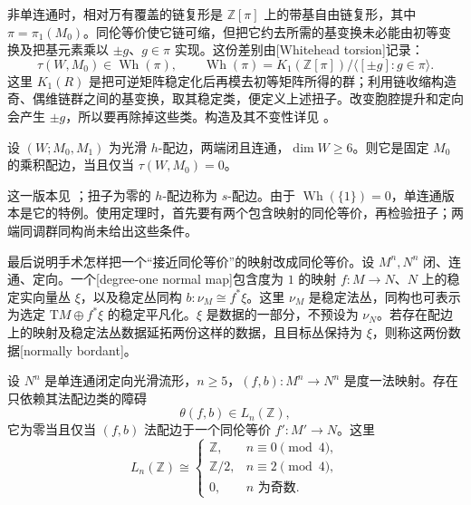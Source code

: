 \ProseParagraphBreak

非单连通时，相对万有覆盖的链复形是 \(\mathbb Z[\pi]\) 上的带基自由链复形，其中 \(\pi=\pi_1(M_0)\)。同伦等价使它链可缩，但把它约去所需的基变换未必能由初等变换及把基元素乘以 \(\pm g\)、\(g\in\pi\) 实现。这份差别由[Whitehead torsion]记录：
\[
	\tau(W,M_0)\in\operatorname{Wh}(\pi),\qquad
	\operatorname{Wh}(\pi)=K_1(\mathbb Z[\pi])/\langle[\pm g]:g\in\pi\rangle.
\]
这里 \(K_1(R)\) 是把可逆矩阵稳定化后再模去初等矩阵所得的群；利用链收缩构造奇、偶维链群之间的基变换，取其稳定类，便定义上述扭子。改变胞腔提升和定向会产生 \(\pm g\)，所以要再除掉这些类。构造及其不变性详见 \cite[第8.1--8.2节]{Ranicki2002Surgery}。

\begin{theorem}[\(s\)-配边定理]\label{g2:thm:s-cobordism}
	设 \((W;M_0,M_1)\) 为光滑 \(h\)-配边，两端闭且连通，\(\dim W\ge6\)。则它是固定 \(M_0\) 的乘积配边，当且仅当 \(\tau(W,M_0)=0\)。
\end{theorem}

这一版本见 \cite[第8.2节]{Ranicki2002Surgery}；扭子为零的 \(h\)-配边称为 \(s\)-配边。由于 \(\operatorname{Wh}(\{1\})=0\)，单连通版本是它的特例。使用定理时，首先要有两个包含映射的同伦等价，再检验扭子；两端同调群同构尚未给出这些条件。

\ProseParagraphBreak

最后说明手术怎样把一个“接近同伦等价”的映射改成同伦等价。设 \(M^n,N^n\) 闭、连通、定向。一个[degree-one normal map]包含度为 \(1\) 的映射 \(f:M\to N\)、\(N\) 上的稳定实向量丛 \(\xi\)，以及稳定丛同构 \(b:\nu_M\cong f^*\xi\)。这里 \(\nu_M\) 是稳定法丛，同构也可表示为选定 \(\mathrm{T}M\oplus f^*\xi\) 的稳定平凡化。\(\xi\) 是数据的一部分，不预设为 \(\nu_N\)。若存在配边上的映射及稳定法丛数据延拓两份这样的数据，且目标丛保持为 \(\xi\)，则称这两份数据[normally bordant]。

\begin{theorem}[手术障碍定理]\label{g2:thm:simply-connected-surgery-obstruction}
	设 \(N^n\) 是单连通闭定向光滑流形，\(n\ge5\)，\((f,b):M^n\to N^n\) 是度一法映射。存在只依赖其法配边类的障碍
	\[
		\theta(f,b)\in L_n(\mathbb Z),
	\]
	它为零当且仅当 \((f,b)\) 法配边于一个同伦等价 \(f':M'\to N\)。这里
	\[
		L_n(\mathbb Z)\cong
		\begin{cases}
			\mathbb Z,&n\equiv0\pmod4,\\
			\mathbb Z/2,&n\equiv2\pmod4,\\
			0,&n\text{ 为奇数}.
		\end{cases}
	\]
\end{theorem}

